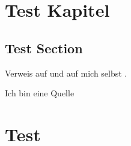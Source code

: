 \documentclass[
    load-preamble = true,             %
    load-dhbw-templates,
    add-bibliography,
    add-tocs-to-toc,
    ngerman,
    debug
]{iodhbwm}
\begin{document}
    
    \dhbwtitlepage
    
    \dhbwdeclaration
    
    \tableofcontents
    \listoffigures
    \listoftables
    
    \chapter{Test Kapitel}\label{chap:test-chap}
        \section{Test Section}\label{sec:test-sec}
            \blindtext
            
            Verweis auf  und auf mich selbst .
            
            \lipsum
            
            Ich bin eine Quelle \cite{Helmke2007}
    \chapter{Test}
\end{document}
